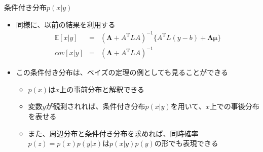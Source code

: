 \begin{frame}{条件付き分布$p(x|y)$}
 \begin{itemize}
  \item 同様に、以前の結果を利用する
        \begin{eqnarray}
         \mathbb{E}[x|y]& =& (\bm{\Lambda}+A^{\mathrm{T}}LA)^{-1}\{A^{\mathrm{T}}L(y-b)+\bm{\Lambda}\bm{\mu}\}\\
         cov[x|y] &= & (\bm{\Lambda}+A^{\mathrm{T}}LA)^{-1}
        \end{eqnarray}
  \item この条件付き分布は、ベイズの定理の例としても見ることができる
        \begin{itemize}
         \item $p(x)$は$x$上の事前分布と解釈できる
         \item 変数$y$が観測されれば、条件付き分布$p(x|y)$を用いて、$x$上での事後分布を表せる
         \item また、周辺分布と条件付き分布を求めれば、同時確率$p(z)=p(x)p(y|x)$は$p(x|y)p(y)$の形でも表現できる
        \end{itemize}
 \end{itemize}

\end{frame}
